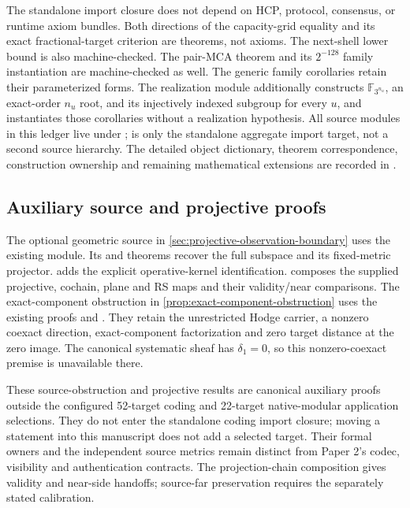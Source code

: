 The standalone import closure does not depend on HCP, protocol, consensus, or
runtime axiom bundles.
Both directions of the capacity-grid equality and its exact fractional-target
criterion are theorems, not axioms.  The next-shell lower bound is also
machine-checked.  The pair-MCA theorem and its \(2^{-128}\) family
instantiation are machine-checked as well.
The generic family corollaries retain their parameterized forms. The
realization module additionally constructs \(\mathbb F_{3^{n_u}}\), an
exact-order \(n_u\) root, and its injectively indexed subgroup for every
\(u\), and instantiates those corollaries without a realization hypothesis.
All source modules in this ledger live under ;
 is only the standalone aggregate import target,
not a second source hierarchy.
The detailed object dictionary, theorem correspondence, construction ownership
and remaining mathematical extensions are recorded in
.

\subsection{Auxiliary source and projective proofs}

The optional geometric source in
\cref{sec:projective-observation-boundary} uses the existing
 module.
Its  and 
theorems recover the full subspace and its fixed-metric projector.
adds the explicit operative-kernel identification.
 composes the supplied
projective, cochain, plane and RS maps and their validity/near comparisons.
The exact-component obstruction in
\cref{prop:exact-component-obstruction} uses the existing
 proofs
 and
.
They retain the unrestricted Hodge carrier, a nonzero coexact direction,
exact-component factorization and zero target distance at the zero image.
The canonical systematic sheaf has \(\delta_1=0\), so this nonzero-coexact
premise is unavailable there.

These source-obstruction and projective results are canonical auxiliary proofs
outside the configured 52-target coding and 22-target native-modular
application selections. They do not enter the standalone coding import
closure; moving a statement into this manuscript does not add a selected
target. Their formal owners and the independent source metrics remain
distinct from Paper 2's codec, visibility and authentication contracts.
The projection-chain composition gives validity and near-side handoffs;
source-far preservation requires the separately stated calibration.

